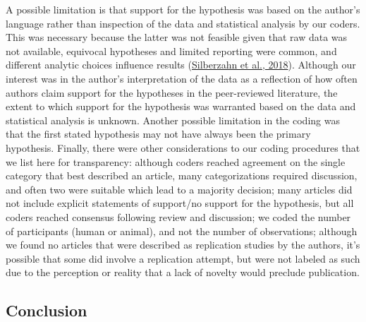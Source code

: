 \documentclass[]{cik}%
\begin{document}
A possible limitation is that support for the hypothesis was based on
the author's language rather than inspection of the data and statistical
analysis by our coders. This was necessary because the latter was not
feasible given that raw data was not available, equivocal hypotheses and
limited reporting were common, and different analytic choices influence
results (\protect\hyperlink{ref-ManyAnalysts2018}{Silberzahn et al.,
2018}). Although our interest was in the author's interpretation of the
data as a reflection of how often authors claim support for the
hypotheses in the peer-reviewed literature, the extent to which support
for the hypothesis was warranted based on the data and statistical
analysis is unknown. Another possible limitation in the coding was that
the first stated hypothesis may not have always been the primary
hypothesis. Finally, there were other considerations to our coding
procedures that we list here for transparency: although coders reached
agreement on the single category that best described an article, many
categorizations required discussion, and often two were suitable which
lead to a majority decision; many articles did not include explicit
statements of support/no support for the hypothesis, but all coders
reached consensus following review and discussion; we coded the number
of participants (human or animal), and not the number of observations;
although we found no articles that were described as replication studies
by the authors, it's possible that some did involve a replication
attempt, but were not labeled as such due to the perception or reality
that a lack of novelty would preclude publication.

\hypertarget{conclusion}{%
\subsection{Conclusion}\label{conclusion}}
\end{document}
